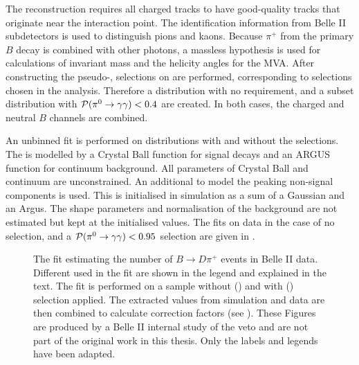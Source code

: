 The reconstruction requires all charged tracks to have good-quality tracks that originate near the interaction point.
The identification information from Belle II subdetectors is used to distinguish pions and kaons.
Because $\pi^+$ from the primary $B$ decay is combined with other photons, a massless hypothesis is used for calculations of invariant mass and the helicity angles for the MVA.
After constructing the pseudo-\piz, selections on \piVeto are performed, corresponding to selections chosen in the analysis.
Therefore a distribution with no \piVeto requirement, and a subset distribution with ${\mathcal{P}(\pi^0\rightarrow\gamma\gamma)}<0.4$ are created.
In both cases, the charged and neutral $B$ channels are combined.

An unbinned \Mbc fit is performed on distributions with and without the \piVeto selections.
The \Mbc is modelled by a Crystal Ball function for signal decays and an ARGUS function for continuum background.
All parameters of Crystal Ball and continuum are unconstrained.
An additional \PDF to model the peaking non-signal \BB components is used.
This \PDF is initialised in simulation as a sum of a Gaussian and an Argus.
The shape parameters and normalisation of the \BB background \PDF are not estimated but kept at the initialised values.
The fits on data in the case of no \piVeto selection, and a ${\mathcal{P}(\pi^0\rightarrow\gamma\gamma)}<0.95$ selection are given in .
\begin{figure}[htbp!]
    \centering
    \caption{\label{fig:pivetofit} The fit estimating the number of $B\to D \pi^+$ events in Belle II data.
    Different  used in the fit are shown in the legend and explained in the text.
    The fit is performed on a sample without () and with () \piVeto selection applied.
    The extracted values from simulation and data are then combined to calculate \piVeto correction factors (see ).
    These Figures are produced by a Belle II internal study of the \piz veto and are not part of the original work in this thesis.
    Only the labels and legends have been adapted.    
    }
\end{figure}

